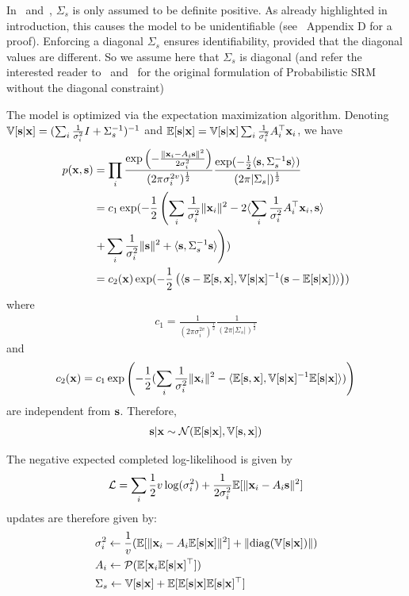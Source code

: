 \documentclass{article}
\begin{document}
In~\cite{chen2015reduced} and~\cite{anderson2016enabling}, $\Sigma_s$ is only assumed to be definite positive.
%
As already highlighted in introduction, this causes the model to be
unidentifiable (see~\cite{richard2020modeling} Appendix D for a proof). Enforcing a diagonal $\Sigma_s$ ensures identifiability, provided that the diagonal values are different.
%
So we assume here that $\Sigma_s$ is diagonal (and refer the interested reader
to~\cite{chen2015reduced} and~\cite{anderson2016enabling} for the original formulation of Probabilistic SRM
without the diagonal constraint)
%



The model is optimized via the expectation maximization algorithm.
%
Denoting $\mathbb{V}[\mathbf{s} | \mathbf{x}] = (\sum_i \frac1{\sigma_i^2} I +
\Sigma_s^{-1})^{-1}$ and $\mathbb{E}[\mathbf{s} | \mathbf{x}] = \mathbb{V}[\mathbf{s} | \mathbf{x}] \sum_i \frac1{\sigma_i^2}
A_i^{\top}\mathbf{x}_i$, we have
\begin{align}
  p(\mathbf{x}, \mathbf{s}) &= \prod_i \frac{\exp \left(-\frac{\|\mathbf{x}_i - A_i \mathbf{s} \|^2}{2 \sigma_i^2} \right) }{(2 \pi \sigma_i^{2v})^{\frac12}} \frac{\exp(-\frac12 \langle{ \mathbf{s}},{ \Sigma_s^{-1} \mathbf{s} }\rangle )}{(2 \pi | \Sigma_s|)^{\frac12}} \\
               &= c_1 \exp (-\frac12 \left( \sum_i \frac1{\sigma_i^2}\|\mathbf{x}_i\|^2 - 2  \langle{ \sum_i \frac1{\sigma_i^2} A_i^{\top}\mathbf{x}_i},{ \mathbf{s} }\rangle \right. \\& \left.+ \sum_i \frac1{\sigma_i^2} \| \mathbf{s} \|^2 + \langle{ \mathbf{s}},{ \Sigma_s^{-1} \mathbf{s} }\rangle  \right)) \\
               &= c_2(\mathbf{x}) \exp(-\frac12 \left( \langle{  \mathbf{s}- \mathbb{E}[\mathbf{s}},{ \mathbf{x}], \mathbb{V}[\mathbf{s} | \mathbf{x}]^{-1} ( \mathbf{s} - \mathbb{E}[\mathbf{s} | \mathbf{x}])  }\rangle \right)) \label{probsrmcompleted}
\end{align}
where
\begin{align}
  c_1 = \frac1{(2 \pi \sigma_i^{2v})^{\frac12}}\frac1{(2 \pi |
  \Sigma_s|)^{\frac12}}
\end{align}
and
\begin{align}
  c_2(\mathbf{x}) = c_1 \exp \left( -\frac12( \sum_i
  \frac1{\sigma_i^2}\|\mathbf{x}_i\|^2 - \langle{  \mathbb{E}[\mathbf{s}},{ \mathbf{x}], \mathbb{V}[\mathbf{s} | \mathbf{x}]^{-1}
  \mathbb{E}[\mathbf{s} | \mathbf{x}] }\rangle) \right)
\end{align}
are independent from $\mathbf{s}$.
%
Therefore,
\begin{align}
  \mathbf{s}| \mathbf{x} \sim \mathcal{N}(\mathbb{E}[\mathbf{s} | \mathbf{x}], \mathbb{V}[\mathbf{s}, \mathbf{x}])
\end{align}

The negative expected completed log-likelihood is given by
\begin{align}
	\mathcal{L} = \sum_i \frac12 v \log(\sigma_i^2) + \frac1{2 \sigma_i^2} \mathbb{E}[\| \mathbf{x}_i - A_i \mathbf{s} \|^2]
\end{align}
updates are therefore given by:
\begin{align}
  &\sigma_i^2 \leftarrow \frac1{v} (\mathbb{E}[\| \mathbf{x}_i - A_i \mathbb{E}[\mathbf{s}|\mathbf{x}]\|^2] + \| {\rm diag}(\mathbb{V}[\mathbf{s} | \mathbf{x}]) \|) \\
  &A_i \leftarrow \mathcal{P}(\mathbb{E}[\mathbf{x}_i \mathbb{E}[\mathbf{s}|\mathbf{x}]^{\top}]) \label{eq:psrm:Aiupdate} \\
  & \Sigma_s \leftarrow \mathbb{V}[\mathbf{s} | \mathbf{x}] + \mathbb{E}[\mathbb{E}[\mathbf{s} | \mathbf{x}] \mathbb{E}[\mathbf{s} | \mathbf{x}]^{\top}]
\end{align}
\end{document}
